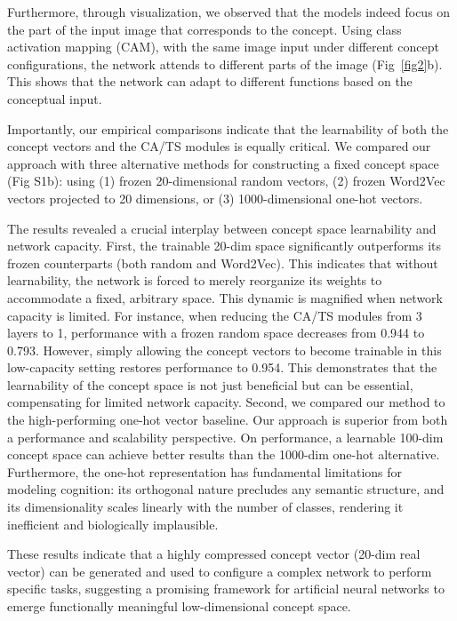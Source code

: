 \documentclass[pdflatex,sn-mathphys-num,lineno]{sn-jnl}%
\begin{document}
\begin{CJK}{UTF8}{gbsn}
Furthermore, through visualization, we observed that the models indeed focus on the part of the input image that corresponds to the concept. Using class activation mapping (CAM), with the same image input under different concept configurations, the network attends to different parts of the image (Fig~\ref{fig2}b). This shows that the network can adapt to different functions based on the conceptual input.

Importantly, our empirical comparisons indicate that the learnability of both the concept vectors and the CA/TS modules is equally critical. We compared our approach with three alternative methods for constructing a fixed concept space (Fig S1b): using (1) frozen 20-dimensional random vectors, (2) frozen Word2Vec vectors projected to 20 dimensions, or (3) 1000-dimensional one-hot vectors.

The results revealed a crucial interplay between concept space learnability and network capacity. First, the trainable 20-dim space significantly outperforms its frozen counterparts (both random and Word2Vec). This indicates that without learnability, the network is forced to merely reorganize its weights to accommodate a fixed, arbitrary space. This dynamic is magnified when network capacity is limited. For instance, when reducing the CA/TS modules from 3 layers to 1, performance with a frozen random space decreases from 0.944 to 0.793. However, simply allowing the concept vectors to become trainable in this low-capacity setting restores performance to 0.954. This demonstrates that the learnability of the concept space is not just beneficial but can be essential, compensating for limited network capacity. Second, we compared our method to the high-performing one-hot vector baseline. Our approach is superior from both a performance and scalability perspective. On performance, a learnable 100-dim concept space can achieve better results than the 1000-dim one-hot alternative. Furthermore, the one-hot representation has fundamental limitations for modeling cognition: its orthogonal nature precludes any semantic structure, and its dimensionality scales linearly with the number of classes, rendering it inefficient and biologically implausible.

These results indicate that a highly compressed concept vector (20-dim real vector) can be generated and used to configure a complex network to perform specific tasks, suggesting a promising framework for artificial neural networks to emerge functionally meaningful low-dimensional concept space. 


\end{CJK}
\end{document}
